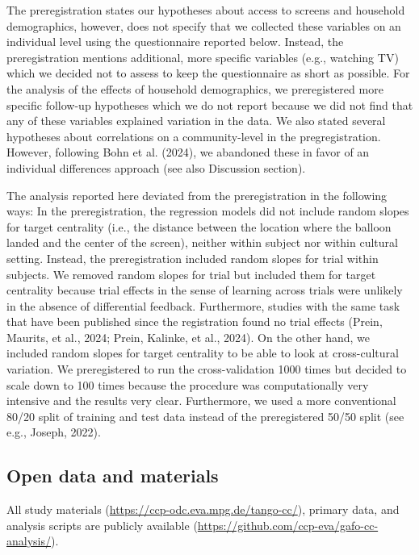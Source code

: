 \documentclass[
  man,floatsintext]{apa7}
\begin{document}
The preregistration states our hypotheses about access to screens and household demographics, however, does not specify that we collected these variables on an individual level using the questionnaire reported below. Instead, the preregistration mentions additional, more specific variables (e.g., watching TV) which we decided not to assess to keep the questionnaire as short as possible. For the analysis of the effects of household demographics, we preregistered more specific follow-up hypotheses which we do not report because we did not find that any of these variables explained variation in the data. We also stated several hypotheses about correlations on a community-level in the pregregistration. However, following Bohn et al. (2024), we abandoned these in favor of an individual differences approach (see also Discussion section).

The analysis reported here deviated from the preregistration in the following ways: In the preregistration, the regression models did not include random slopes for target centrality (i.e., the distance between the location where the balloon landed and the center of the screen), neither within subject nor within cultural setting. Instead, the preregistration included random slopes for trial within subjects. We removed random slopes for trial but included them for target centrality because trial effects in the sense of learning across trials were unlikely in the absence of differential feedback. Furthermore, studies with the same task that have been published since the registration found no trial effects (Prein, Maurits, et al., 2024; Prein, Kalinke, et al., 2024). On the other hand, we included random slopes for target centrality to be able to look at cross-cultural variation. We preregistered to run the cross-validation 1000 times but decided to scale down to 100 times because the procedure was computationally very intensive and the results very clear. Furthermore, we used a more conventional 80/20 split of training and test data instead of the preregistered 50/50 split (see e.g., Joseph, 2022).

\subsection{Open data and materials}\label{open-data-and-materials}

All study materials (\url{https://ccp-odc.eva.mpg.de/tango-cc/}), primary data, and analysis scripts are publicly available (\url{https://github.com/ccp-eva/gafo-cc-analysis/}).
\end{document}
